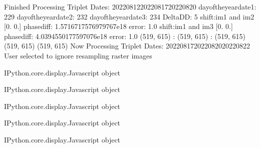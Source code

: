 \documentclass[letterpaper,10pt]{sphinxmanual}
\begin{document}
\begin{sphinxVerbatim}[commandchars=\\\{\}]
Finished Processing Triplet Dates:  20220812\PYGZhy{}20220817\PYGZhy{}20220820
day\PYGZus{}of\PYGZus{}the\PYGZus{}year\PYGZus{}date1:  229
\PYGZhy{}\PYGZhy{}\PYGZhy{}\PYGZhy{}\PYGZhy{}\PYGZhy{}\PYGZhy{}\PYGZhy{}\PYGZhy{}\PYGZhy{}\PYGZhy{}\PYGZhy{}\PYGZhy{}\PYGZhy{}\PYGZhy{}\PYGZhy{}\PYGZhy{}\PYGZhy{}\PYGZhy{}\PYGZhy{}\PYGZhy{}
day\PYGZus{}of\PYGZus{}the\PYGZus{}year\PYGZus{}date2:  232
\PYGZhy{}\PYGZhy{}\PYGZhy{}\PYGZhy{}\PYGZhy{}\PYGZhy{}\PYGZhy{}\PYGZhy{}\PYGZhy{}\PYGZhy{}\PYGZhy{}\PYGZhy{}\PYGZhy{}\PYGZhy{}\PYGZhy{}\PYGZhy{}\PYGZhy{}\PYGZhy{}\PYGZhy{}\PYGZhy{}\PYGZhy{}
day\PYGZus{}of\PYGZus{}the\PYGZus{}year\PYGZus{}date3:  234
\PYGZhy{}\PYGZhy{}\PYGZhy{}\PYGZhy{}\PYGZhy{}\PYGZhy{}\PYGZhy{}\PYGZhy{}\PYGZhy{}\PYGZhy{}\PYGZhy{}\PYGZhy{}\PYGZhy{}\PYGZhy{}\PYGZhy{}\PYGZhy{}\PYGZhy{}\PYGZhy{}\PYGZhy{}\PYGZhy{}\PYGZhy{}
Delta\PYGZus{}DD: 5
shift:im1 and im2 [0. 0.] phasediff: \PYGZhy{}1.5716717576979767e\PYGZhy{}18 error: 1.0
shift:im1 and im3 [0. 0.] phasediff: \PYGZhy{}4.0394550177597076e\PYGZhy{}18 error: 1.0
(519, 615) :  (519, 615) :  (519, 615)
(519, 615)
(519, 615)
Now Processing Triplet Dates:  20220817\PYGZhy{}20220820\PYGZhy{}20220822
 User selected to ignore resampling raster images 



\PYGZlt{}IPython.core.display.Javascript object\PYGZgt{}
\end{sphinxVerbatim}



\begin{sphinxVerbatim}[commandchars=\\\{\}]
\PYGZlt{}IPython.core.display.Javascript object\PYGZgt{}
\end{sphinxVerbatim}



\begin{sphinxVerbatim}[commandchars=\\\{\}]
\PYGZlt{}IPython.core.display.Javascript object\PYGZgt{}
\end{sphinxVerbatim}



\begin{sphinxVerbatim}[commandchars=\\\{\}]
\PYGZlt{}IPython.core.display.Javascript object\PYGZgt{}
\end{sphinxVerbatim}



\begin{sphinxVerbatim}[commandchars=\\\{\}]
\PYGZlt{}IPython.core.display.Javascript object\PYGZgt{}
\end{sphinxVerbatim}
\end{document}
